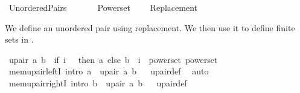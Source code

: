 %
\begin{isabellebody}%
%
%
\isadelimdocument
%
\endisadelimdocument
%
\isatagdocument
\isanewline
\isanewline
%
\isamarkuptrue%
%
\endisatagdocument
{\isafolddocument}%
%
\isadelimdocument
%
\endisadelimdocument
%
\isadelimtheory
%
\endisadelimtheory
%
\isatagtheory
{}\isamarkupfalse%
\ Unordered{\isacharunderscore}{\kern0pt}Pairs\isanewline
\ \ \isanewline
\ \ \ \ Powerset\isanewline
\ \ \ \ Replacement\isanewline
{}%
\endisatagtheory
{\isafoldtheory}%
%
\isadelimtheory
%
\endisadelimtheory
%
\begin{isamarkuptext}%
We define an unordered pair  using replacement.
We then use it to define finite sets in .%
\end{isamarkuptext}\isamarkuptrue%
\isamarkupfalse%
\ {\isachardoublequoteopen}upair\ a\ b\ {\isasymequiv}\ {\isacharbraceleft}{\kern0pt}if\ i\ {\isacharequal}{\kern0pt}\ {\isacharbraceleft}{\kern0pt}{\isacharbraceright}{\kern0pt}\ then\ a\ else\ b\ {\isacharbar}{\kern0pt}\ i\ {\isasymin}\ powerset\ {\isacharparenleft}{\kern0pt}powerset\ {\isacharbraceleft}{\kern0pt}{\isacharbraceright}{\kern0pt}{\isacharparenright}{\kern0pt}{\isacharbraceright}{\kern0pt}{\isachardoublequoteclose}\isanewline
\isanewline
{}\isamarkupfalse%
\ mem{\isacharunderscore}{\kern0pt}upair{\isacharunderscore}{\kern0pt}leftI\ {\isacharbrackleft}{\kern0pt}intro{\isacharbrackright}{\kern0pt}{\isacharcolon}{\kern0pt}\ {\isachardoublequoteopen}a\ {\isasymin}\ upair\ a\ b{\isachardoublequoteclose}%
\isadelimproof
\ %
\endisadelimproof
%
\isatagproof
{}\isamarkupfalse%
\ upair{\isacharunderscore}{\kern0pt}def\ \isamarkupfalse%
\ auto%
\endisatagproof
{\isafoldproof}%
%
\isadelimproof
%
\endisadelimproof
\isanewline
{}\isamarkupfalse%
\ mem{\isacharunderscore}{\kern0pt}upair{\isacharunderscore}{\kern0pt}rightI\ {\isacharbrackleft}{\kern0pt}intro{\isacharbrackright}{\kern0pt}{\isacharcolon}{\kern0pt}\ {\isachardoublequoteopen}b\ {\isasymin}\ upair\ a\ b{\isachardoublequoteclose}%
\isadelimproof
\ %
\endisadelimproof
%
\isatagproof
{}\isamarkupfalse%
\ upair{\isacharunderscore}{\kern0pt}def\ \isamarkupfalse%

\end{isabellebody}
